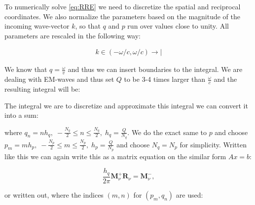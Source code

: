 \documentclass[../main.tex]{subfiles}
\begin{document}
To numerically solve \autoref{eq:RRE} we need to discretize the spatial and reciprocal coordinates. We also normalize the parameters based on the magnitude of the incoming wave-vector $k$, so that $q$ and $p$ run over values close to unity. All parameters are rescaled in the following way:

\begin{align*}
    k \in (-\omega/c, \omega/c) \rightarrow|
\end{align*}

We know that $q = \frac{\omega}{v}$ and thus we can insert boundaries to the integral. We are dealing with EM-waves and thus set $Q$ to be 3-4 times larger than $\frac{\omega}{c}$ and the resulting integral will be:


The integral  we are to discretize and approximate this integral we can convert it into a sum:



where $q_n = nh_q, \; -\frac{N_q}{2} \leq n \leq \frac{N_q}{2}, \; h_q = \frac{Q}{N_q}$. We do the exact same to $p$ and choose $p_m = mh_p, \; -\frac{N_p}{2} \leq m \leq \frac{N_p}{2}, \; h_p = \frac{Q}{N_p}$ and choose $N_q = N_p$ for simplicity. Written like this we can again write this as a matrix equation on the similar form $Ax=b$:

\begin{equation}
    \frac{h_q}{2\pi}\boldsymbol{M}_\nu^+\boldsymbol{R}_{\nu} = \boldsymbol{M}_\nu^-,
\end{equation}

or written out, where the indices $\left(m, n \right)$ for $\left(p_m, q_n \right)$ are used:
\end{document}
